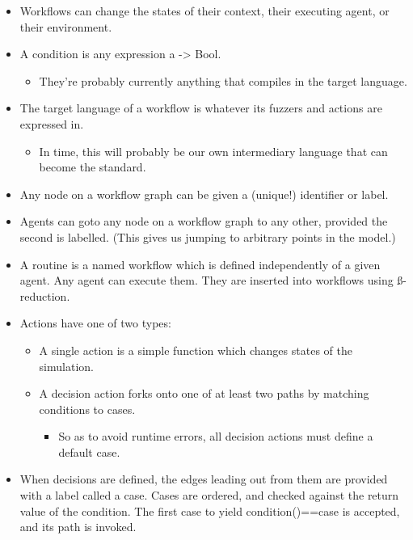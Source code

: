 \documentclass[11pt]{article}
\begin{document}
\begin{itemize}
\item Workflows can change the states of their context, their executing agent, or their environment.
\item A condition is any expression a -> Bool. 
\begin{itemize}
\item They’re probably currently anything that compiles in the target language.
\end{itemize}
\item The target language of a workflow is whatever its fuzzers and actions are expressed in.
\begin{itemize}
\item In time, this will probably be our own intermediary language that can become the standard.
\end{itemize}
\item Any node on a workflow graph can be given a (unique!) identifier or label.
\item Agents can goto any node on a workflow graph to any other, provided the second is labelled. (This gives us jumping to arbitrary points in the model.)
\item A routine is a named workflow which is defined independently of a given agent. Any agent can execute them. They are inserted into workflows using ß-reduction.
\item Actions have one of two types:
\begin{itemize}
\item A single action is a simple function which changes states of the simulation.
\item A decision action forks onto one of at least two paths by matching conditions to cases. 
\begin{itemize}
\item So as to avoid runtime errors, all decision actions must define a default case.
\end{itemize}
\end{itemize}
\item When decisions are defined, the edges leading out from them are provided with a label called a case. Cases are ordered, and checked against the return value of the condition. The first case to yield condition()==case is accepted, and its path is invoked.
\end{itemize}
\end{document}
